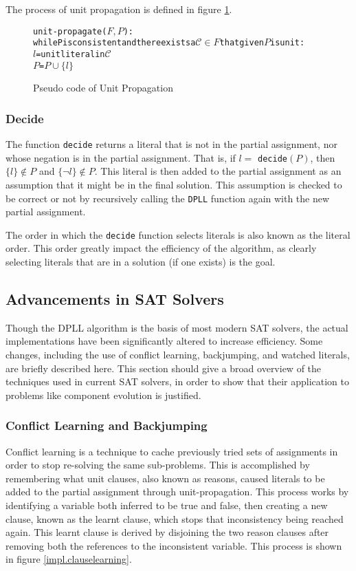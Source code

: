 The process of unit propagation is defined in figure \ref{impl.propagation}.
\begin{figure}[htp]
\begin{center}
\begin{alltt}
unit-propagate(\(F, P\)):
  while P is consistent and there exists a \(\mathcal{C} \in F\) that given \(P\) is unit:
    \(l\) = unit literal in \(\mathcal{C}\)
    \(P\) = \(P \cup \{l\}\)
\end{alltt}
  \caption{Pseudo code of Unit Propagation}
  \label{impl.propagation}
\end{center}
\end{figure}

\subsubsection{Decide}
\label{impl.litorder}
The function \verb+decide+ returns a literal that is not in the partial assignment, nor whose negation is in the partial assignment.
That is, if $l =$ \verb+decide+$(P)$, then $\{l\} \not \in P$ and $\{\neg l\} \not \in P$.
This literal is then added to the partial assignment as an assumption that it might be in the final solution.
This assumption is checked to be correct or not by recursively calling the \texttt{DPLL} function again with the new partial assignment.

The order in which the \verb+decide+ function selects literals is also known as the literal order.
This order greatly impact the efficiency of the algorithm, as clearly selecting literals that are in a solution (if one exists) is the goal.

\subsection{Advancements in SAT Solvers}
Though the DPLL algorithm is the basis of most modern SAT solvers, the actual implementations have been significantly altered to increase efficiency.
Some changes, including the use of conflict learning, backjumping, and watched literals, are briefly described here.
This section should give a broad overview of the techniques used in current SAT solvers, 
in order to show that their application to problems like component evolution is justified. 

\subsubsection{Conflict Learning and Backjumping}
Conflict learning \citep{stallman1976} is a technique to cache previously tried sets of assignments in order to stop re-solving the same sub-problems.
This is accomplished by remembering what unit clauses, also known as reasons, caused literals to be added to the partial assignment through unit-propagation. 
This process works by identifying a variable both inferred to be true and false,
then creating a new clause, known as the learnt clause, which stops that inconsistency being reached again.
This learnt clause is derived by disjoining the two reason clauses after removing both the references to the inconsistent variable.
This process is shown in figure \ref{impl.clauselearning}. 

